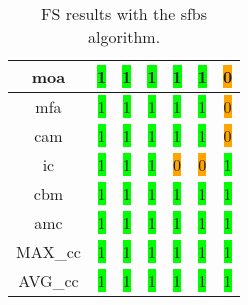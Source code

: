 \begin{table}[H]
\begin{tabular}{|c|c|c|c|c|c|c|}
        \acrshort{moa} & \colorbox{lime}{1} & \colorbox{lime}{1} & \colorbox{lime}{1} & \colorbox{lime}{1} & \colorbox{lime}{1} & \colorbox{orange}{0} \\ \hline
        \acrshort{mfa} & \colorbox{lime}{1} & \colorbox{lime}{1} & \colorbox{lime}{1} & \colorbox{lime}{1} & \colorbox{lime}{1} & \colorbox{orange}{0} \\ \hline
        \acrshort{cam} & \colorbox{lime}{1} & \colorbox{lime}{1} & \colorbox{lime}{1} & \colorbox{lime}{1} & \colorbox{lime}{1} & \colorbox{orange}{0} \\ \hline
        \acrshort{ic} & \colorbox{lime}{1} & \colorbox{lime}{1} & \colorbox{lime}{1} & \colorbox{orange}{0} & \colorbox{orange}{0} & \colorbox{lime}{1} \\ \hline
        \acrshort{cbm} & \colorbox{lime}{1} & \colorbox{lime}{1} & \colorbox{lime}{1} & \colorbox{lime}{1} & \colorbox{lime}{1} & \colorbox{lime}{1} \\ \hline
        \acrshort{amc} & \colorbox{lime}{1} & \colorbox{lime}{1} & \colorbox{lime}{1} & \colorbox{lime}{1} & \colorbox{lime}{1} & \colorbox{lime}{1} \\ \hline
        MAX\_\acrshort{cc} & \colorbox{lime}{1} & \colorbox{lime}{1} & \colorbox{lime}{1} & \colorbox{lime}{1} & \colorbox{lime}{1} & \colorbox{lime}{1} \\ \hline
        AVG\_\acrshort{cc} & \colorbox{lime}{1} & \colorbox{lime}{1} & \colorbox{lime}{1} & \colorbox{lime}{1} & \colorbox{lime}{1} & \colorbox{lime}{1} \\ \hline
    \end{tabular}
\caption{FS results with the \acrlong{sfbs} algorithm.}
\label{tab:sfbs-output}
\end{table}

